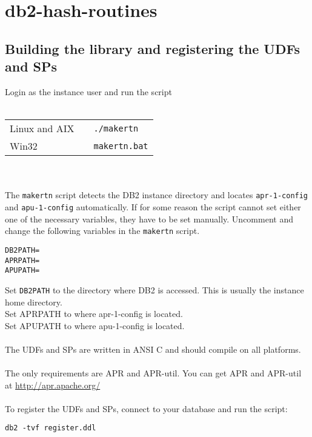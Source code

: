 \section{db2-hash-routines}
\subsection{Building the library and registering the UDFs and SPs}
Login as the instance user and run the script\\
\\
\begin{tabular}{@{} lll @{}}
Linux and AIX & & {\tt ./makertn}\\
Win32         & & {\tt makertn.bat}\\
\end{tabular}
\\\\
The {\tt makertn} script detects the DB2 instance directory and locates {\tt apr-1-config} and {\tt apu-1-config} automatically. If for some reason the script cannot set either one of the necessary variables, they have to be set manually.
Uncomment and change the following variables in the {\tt makertn} script.
\begin{verbatim}
DB2PATH=
APRPATH=
APUPATH=
\end{verbatim}
Set {\tt DB2PATH} to the directory where DB2 is accessed. This is usually the instance home directory.\\
Set APRPATH to where apr-1-config is located.\\
Set APUPATH to where apu-1-config is located.\\
\\
The UDFs and SPs are written in ANSI C and should compile on all platforms.\\
\\
The only requirements are APR and \mbox{APR-util}.
You can get APR and APR-util at \url{http://apr.apache.org/} \\
\\
To register the UDFs and SPs, connect to your database and run the script:
\begin{verbatim}
db2 -tvf register.ddl
\end{verbatim}
\newpage
